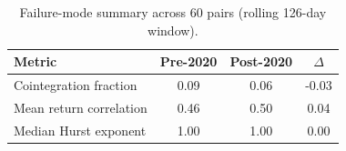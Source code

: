 \begin{table}[h]
\centering
\caption{Failure-mode summary across 60 pairs (rolling 126-day window).}
\label{tab:failure_modes}
\small
\begin{tabular}{lccc}
\hline
\textbf{Metric} & \textbf{Pre-2020} & \textbf{Post-2020} & \textbf{$\Delta$} \\
\hline
Cointegration fraction & 0.09 & 0.06 & -0.03 \\
Mean return correlation & 0.46 & 0.50 & 0.04 \\
Median Hurst exponent & 1.00 & 1.00 & 0.00 \\
\hline
\end{tabular}
\end{table}
